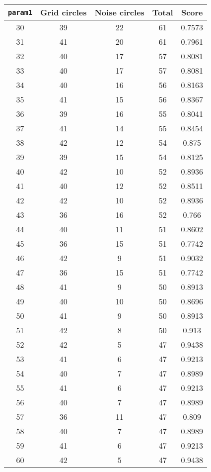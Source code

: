 \documentclass[letterpaper, 12pt]{article}
\begin{document}
\begin{longtable}{|c|c|c|c|c|}
\hline
\textbf{\texttt{param1}} & \textbf{Grid circles} & \textbf{Noise circles} & \textbf{Total} & \textbf{Score} \\
\hline
30 & 39 & 22 & 61 & 0.7573 \\
\hline
31 & 41 & 20 & 61 & 0.7961 \\
\hline
32 & 40 & 17 & 57 & 0.8081 \\
\hline
33 & 40 & 17 & 57 & 0.8081 \\
\hline
34 & 40 & 16 & 56 & 0.8163 \\
\hline
35 & 41 & 15 & 56 & 0.8367 \\
\hline
36 & 39 & 16 & 55 & 0.8041 \\
\hline
37 & 41 & 14 & 55 & 0.8454 \\
\hline
38 & 42 & 12 & 54 & 0.875 \\
\hline
39 & 39 & 15 & 54 & 0.8125 \\
\hline
40 & 42 & 10 & 52 & 0.8936 \\
\hline
41 & 40 & 12 & 52 & 0.8511 \\
\hline
42 & 42 & 10 & 52 & 0.8936 \\
\hline
43 & 36 & 16 & 52 & 0.766 \\
\hline
44 & 40 & 11 & 51 & 0.8602 \\
\hline
45 & 36 & 15 & 51 & 0.7742 \\
\hline
46 & 42 & 9 & 51 & 0.9032 \\
\hline
47 & 36 & 15 & 51 & 0.7742 \\
\hline
48 & 41 & 9 & 50 & 0.8913 \\
\hline
49 & 40 & 10 & 50 & 0.8696 \\
\hline
50 & 41 & 9 & 50 & 0.8913 \\
\hline
51 & 42 & 8 & 50 & 0.913 \\
\hline
52 & 42 & 5 & 47 & 0.9438 \\
\hline
53 & 41 & 6 & 47 & 0.9213 \\
\hline
54 & 40 & 7 & 47 & 0.8989 \\
\hline
55 & 41 & 6 & 47 & 0.9213 \\
\hline
56 & 40 & 7 & 47 & 0.8989 \\
\hline
57 & 36 & 11 & 47 & 0.809 \\
\hline
58 & 40 & 7 & 47 & 0.8989 \\
\hline
59 & 41 & 6 & 47 & 0.9213 \\
\hline
60 & 42 & 5 & 47 & 0.9438 \\

\end{longtable}
\end{document}
